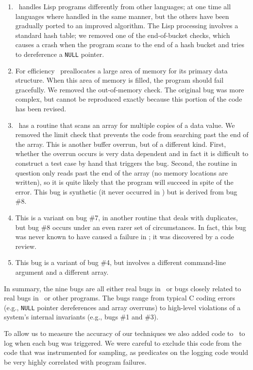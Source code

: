 \begin{enumerate}
\item \moss\ handles Lisp programs differently from other languages;
at one time all languages where handled in the same manner, but the
others have been gradually ported to an improved algorithm.  The Lisp
processing involves a standard hash table; we removed one of the
end-of-bucket checks, which causes a crash when the program scans to
the end of a hash bucket and tries to dereference a \texttt{NULL} pointer. 

\item For efficiency \moss\ preallocates a large area of memory for its primary data structure.
When this area of memory is filled, the program should fail
gracefully.  We removed the out-of-memory check.  The original bug
was more complex, but cannot be reproduced exactly because this
portion of the code has been revised.

\item \moss\ has a routine that scans an array for multiple copies of a data value.
We removed the limit check that prevents the code from searching past the end of the array.  This is another
buffer overrun, but of a different kind.  First, whether the overrun occurs is very data dependent and in fact it is
difficult to construct a test case by hand that triggers the bug.  Second, the routine in question only reads
past the end of the array (no memory locations are written), so it is quite likely that the program will
succeed in spite of the error.  This bug is synthetic (it never occurred in \moss) but is derived from bug \#8.

\item This is a variant on bug \#7, in another routine that deals with duplicates, but
bug \#8 occurs under an even rarer set of circumstances.  In
fact, this bug was never known to have caused a failure in \moss; it
was discovered by a code review.

\item This bug is a variant of bug \#4, but involves a different command-line argument and
a different array.
\end{enumerate}

In summary, the nine bugs are all either real bugs in \moss\ or bugs
closely related to real bugs in \moss\ or other programs.  The bugs
range from typical C coding errors (e.g., \texttt{NULL} pointer dereferences
and array overruns) to high-level violations of a system's internal
invariants (e.g., bugs \#1 and \#3).

To allow us to measure the accuracy of our techniques we also added code to \moss\ to
log when each bug was triggered.  We were careful to exclude this code from the
code that was instrumented for sampling, as predicates on the logging code would be
very highly correlated with program failures.

